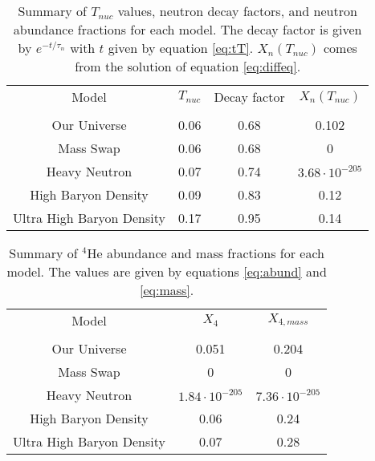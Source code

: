 \documentclass[aps,reprint,prl]{revtex4-1}
\begin{document}
\begin{table}[h]
\begin{tabular}{c|c|c|c|}
Model                     & $T_{nuc}$ & Decay factor & $X_n(T_{nuc})$        \\
                          &           &              &                       \\ \hline
Our Universe              & 0.06      & 0.68         & 0.102                 \\ \hline
Mass Swap                 & 0.06      & 0.68         & 0                     \\ \hline
Heavy Neutron             & 0.07      & 0.74         & $3.68\cdot 10^{-205}$ \\ \hline
High Baryon Density       & 0.09      & 0.83         & 0.12                  \\ \hline
Ultra High Baryon Density & 0.17      & 0.95         & 0.14                 
\end{tabular}
\caption{Summary of $T_{nuc}$ values, neutron decay factors, and neutron abundance fractions for each model.  The decay factor is given by $e^{-t/\tau_n}$ with $t$ given by equation \ref{eq:tT}.  $X_n(T_{nuc})$ comes from the solution of equation \ref{eq:diffeq}.}
\end{table}
\begin{table}[h]
\begin{tabular}{c|c|c}
Model                     & $X_4$                 & $X_{4,mass}$          \\
                          &                       &                       \\ \hline
Our Universe              & 0.051                 & 0.204                 \\ \hline
Mass Swap                 & 0                     & 0                     \\ \hline
Heavy Neutron             & $1.84\cdot 10^{-205}$ & $7.36\cdot 10^{-205}$ \\ \hline
High Baryon Density       & 0.06                  & 0.24                  \\ \hline
Ultra High Baryon Density & 0.07                  & 0.28                 
\end{tabular}
\caption{Summary of $^4$He abundance and mass fractions for each model.  The values are given by equations \ref{eq:abund} and \ref{eq:mass}.}
\end{table}
\end{document}
